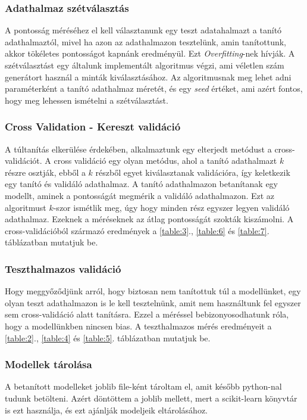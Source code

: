 \documentclass[12pt,a4paper]{article}
\begin{document}
\subsubsection{Adathalmaz szétválasztás}
A pontosság méréséhez el kell választanunk egy teszt adatahalmazt a tanító adathalmaztól, mivel ha azon az adathalmazon tesztelünk, amin tanítottunk,
akkor tökéletes pontosságot kapnánk eredményül. Ezt \emph{Overfitting}-nek hívják. A szétválasztást egy általunk implementált algoritmus végzi, ami véletlen szám generátort használ a
minták kiválasztásához. Az algoritmusnak meg lehet adni paraméterként a tanító adathalmaz méretét, és egy \emph{seed} értéket, ami azért fontos, hogy meg
lehessen ismételni a szétválasztást.
\subsubsection{Cross Validation - Kereszt validáció}
A túltanítás elkerülése érdekében, alkalmaztunk egy elterjedt metódust a cross-validációt. A cross validáció egy olyan metódus, ahol a tanító adathalmazt
$k$ részre osztják, ebből a $k$ részből egyet kiválasztanak validációra, így keletkezik egy tanító és validáló adathalmaz. A tanító adathalmazon betanítanak
egy modellt, aminek a pontosságát megmérik a validáló adathalmazon. Ezt az algoritmust $k$-szor ismétlik meg, úgy hogy minden rész egyszer legyen validáló
adathalmaz. Ezeknek a méréseknek az átlag pontosságát szokták kiszámolni. A cross-validációból származó eredmények a \ref{table:3}., \ref{table:6} és \ref{table:7}.
táblázatban mutatjuk be.
\subsubsection{Teszthalmazos validáció}
Hogy meggyőződjünk arról, hogy biztosan nem tanítottuk túl a modellünket, egy olyan teszt adathalmazon is le kell tesztelnünk, amit nem használtunk fel egyszer sem
cross-validáció alatt tanításra. Ezzel a méréssel bebizonyosodhatunk róla, hogy a modellünkben nincsen bias. A teszthalmazos mérés eredményeit a \ref{table:2}., \ref{table:4} és \ref{table:5}.
táblázatban mutatjuk be.
\subsubsection{Modellek tárolása}
A betanított modelleket joblib file-ként tároltam el, amit később python-nal tudunk betölteni. Azért döntöttem a joblib mellett, mert a scikit-learn könyvtár
is ezt használja, és ezt ajánlják modeljeik eltárolásához.
\end{document}
